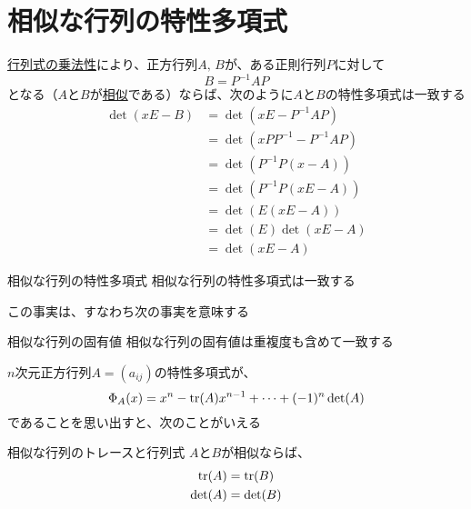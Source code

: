 \documentclass[../../../topic_linear-algebra]{subfiles}
\begin{document}
\sectionline
\section{相似な行列の特性多項式}

\hyperref[thm:determinant-multiplicativity]{行列式の乗法性}により、正方行列$A,\,B$が、ある正則行列$P$に対して
\begin{equation*}
  B = P^{-1}AP
\end{equation*}
となる（$A$と$B$が\hyperref[def:similar-matrices]{相似}である）ならば、次のように$A$と$B$の特性多項式は一致する
\begin{align*}
  \det(xE - B) & = \det(xE - P^{-1}AP)       \\
               & = \det(xPP^{-1} - P^{-1}AP) \\
               & = \det(P^{-1}P(x - A))      \\
               & = \det(P^{-1}P(xE - A))     \\
               & = \det(E(xE - A))           \\
               & = \det(E)\det(xE - A)       \\
               & = \det(xE - A)
\end{align*}

\begin{theorem}{相似な行列の特性多項式}
  相似な行列の特性多項式は一致する
\end{theorem}

この事実は、すなわち次の事実を意味する

\begin{theorem}{相似な行列の固有値}
  相似な行列の固有値は重複度も含めて一致する
\end{theorem}

\sectionline

$n$次元正方行列$A = (a_{ij})$の特性多項式が、
\begin{equation*}
  \Phi_A(x) = x^n - \tr(A)x^{n-1} + \cdots + (-1)^n \det(A)
\end{equation*}
であることを思い出すと、次のことがいえる

\begin{theorem}{相似な行列のトレースと行列式}
  $A$と$B$が相似ならば、
  \begin{align*}
    \tr(A)  & = \tr(B)  \\
    \det(A) & = \det(B)
  \end{align*}
\end{theorem}
\end{document}

